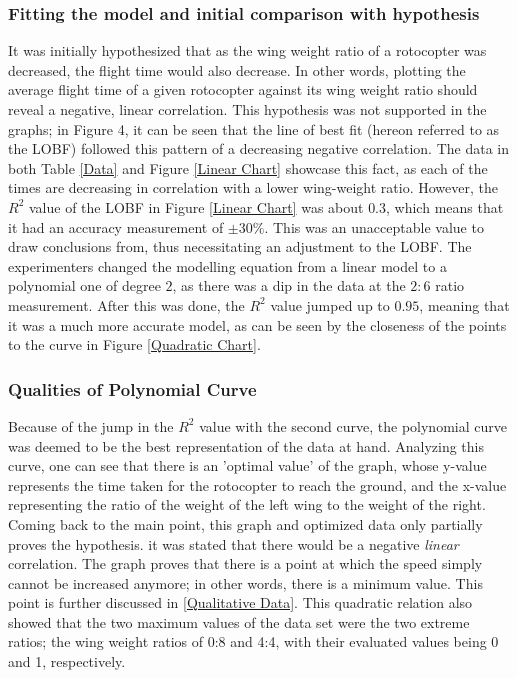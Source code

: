 \documentclass[]{article}
\theoremstyle{definition}
\begin{document}
\subsubsection{Fitting the model and initial comparison with hypothesis}
It was initially hypothesized that as the wing weight ratio of a rotocopter was decreased, the flight time would also decrease. In other words, plotting the average flight time of a given rotocopter against its wing weight ratio should reveal a negative, linear correlation. This hypothesis was not supported in the graphs; in Figure 4, it can be seen that the line of best fit (hereon referred to as the LOBF) followed this pattern of a decreasing negative correlation. The data in both Table \ref{Data} and Figure \ref{Linear Chart} showcase this fact, as each of the times are decreasing in correlation with a lower wing-weight ratio. However, the $R^2$ value of the LOBF in Figure \ref{Linear Chart} was about $0.3$, which means that it had an accuracy measurement of $\pm 30\%$. This was an unacceptable value to draw conclusions from, thus necessitating an adjustment to the LOBF. The experimenters changed the modelling equation from a linear model to a polynomial one of degree $2$, as there was a dip in the data at the $2:6$ ratio measurement. After this was done, the $R^2$ value jumped up to $0.95$, meaning that it was a much more accurate model, as can be seen by the closeness of the points to the curve in Figure \ref{Quadratic Chart}.

\subsubsection{Qualities of Polynomial Curve}
Because of the jump in the $R^2$ value with the second curve, the polynomial curve was deemed to be the best representation of the data at hand. Analyzing this curve, one can see that there is an 'optimal value' of the graph, whose y-value represents the time taken for the rotocopter to reach the ground, and the x-value representing the ratio of the weight of the left wing to the weight of the right. Coming back to the main point, this graph and optimized data only partially proves the hypothesis. it was stated that there would be a negative \textit{linear} correlation. The graph proves that there is a point at which the speed simply cannot be increased anymore; in other words, there is a minimum value. This point is further discussed in \ref{Qualitative Data}. This quadratic relation also showed that the two maximum values of the data set were the two extreme ratios; the wing weight ratios of 0:8 and 4:4, with their evaluated values being 0 and 1, respectively.
\end{document}
